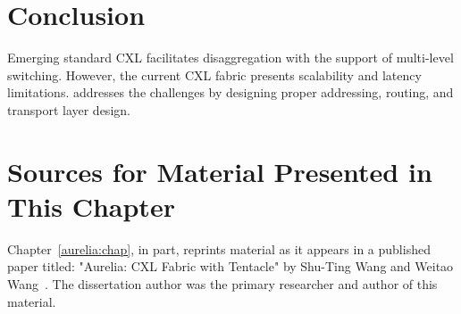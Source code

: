 
%


\section{Conclusion}
\label{aurelia:sec:conclusion}
%
Emerging standard CXL facilitates disaggregation with the support of multi-level switching. 
%
However, the current CXL fabric presents scalability and latency limitations. \aurelia addresses the challenges by designing proper addressing, routing, and transport layer design.

\section{Sources for Material Presented in This Chapter}
Chapter~\ref{aurelia:chap}, in part, reprints material as it appears in a published paper titled: 
"Aurelia: CXL Fabric with Tentacle" by Shu-Ting Wang and Weitao Wang~\cite{aurelia:words:2023}. 
%
The dissertation author was the primary researcher and author of this material.